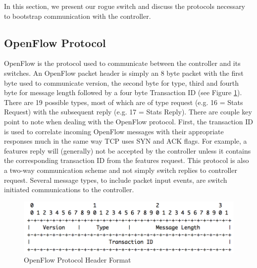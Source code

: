 In this section, we present our rogue switch and discuss the protocols necessary to bootstrap communication with the controller.

\subsection {OpenFlow Protocol}
OpenFlow is the protocol used to communicate between the controller and its switches. An OpenFlow packet header is simply an 8 byte packet with the first byte used to communicate version, the second byte for type, third and fourth byte for message length followed by a four byte Transaction ID (see Figure \ref{fig:protocol}). There are 19 possible types, most of which are of type request (e.g. 16 = Stats Request) with the subsequent reply (e.g. 17 = Stats Reply). There are couple key point to note when dealing with the OpenFlow protocol. First, the transaction ID is used to correlate incoming OpenFlow messages with their appropriate responses much in the same way TCP uses SYN and ACK flags. For example, a features reply will (generally) not be accepted by the controller unless it contains the corresponding transaction ID from the features request. This protocol is also a two-way communication scheme and not simply switch replies to controller request. Several message types, to include packet input events, are switch initiated communications to the controller.  

\begin{figure}
  \includegraphics[width=\linewidth]{openflowProtocol.png}
  \caption{OpenFlow Protocol Header Format \cite{protocol}}
  \label{fig:protocol}
\end{figure}

